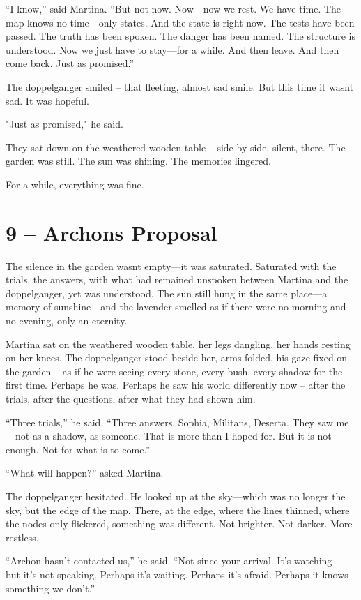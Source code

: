 \documentclass[
]{article}
\begin{document}
``I know,'' said Martina. ``But not now. Now---now we rest. We have time. The map knows no time---only states. And the state is right now. The tests have been passed. The truth has been spoken. The danger has been named. The structure is understood. Now we just have to stay---for a while. And then leave. And then come back. Just as promised.''

The doppelganger smiled -- that fleeting, almost sad smile. But this time it wasn\textquotesingle t sad. It was hopeful.

"Just as promised," he said.

They sat down on the weathered wooden table -- side by side, silent, there. The garden was still. The sun was shining. The memories lingered.

For a while, everything was fine.

\section{9 -- Archon\textquotesingle s Proposal}\label{archons-proposal}

The silence in the garden wasn\textquotesingle t empty---it was saturated. Saturated with the trials, the answers, with what had remained unspoken between Martina and the doppelganger, yet was understood. The sun still hung in the same place---a memory of sunshine---and the lavender smelled as if there were no morning and no evening, only an eternity.

Martina sat on the weathered wooden table, her legs dangling, her hands resting on her knees. The doppelganger stood beside her, arms folded, his gaze fixed on the garden -- as if he were seeing every stone, every bush, every shadow for the first time. Perhaps he was. Perhaps he saw his world differently now -- after the trials, after the questions, after what they had shown him.

``Three trials,'' he said. ``Three answers. Sophia, Militans, Deserta. They saw me---not as a shadow, as someone. That is more than I hoped for. But it is not enough. Not for what is to come.''

``What will happen?'' asked Martina.

The doppelganger hesitated. He looked up at the sky---which was no longer the sky, but the edge of the map. There, at the edge, where the lines thinned, where the nodes only flickered, something was different. Not brighter. Not darker. More restless.

``Archon hasn't contacted us,'' he said. ``Not since your arrival. It's watching -- but it's not speaking. Perhaps it's waiting. Perhaps it's afraid. Perhaps it knows something we don't.''
\end{document}
